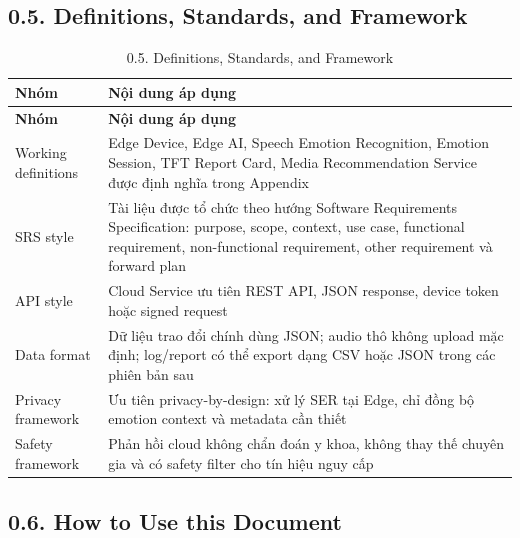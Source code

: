\documentclass[12pt,a4paper]{article}
\begin{document}
\subsection*{0.5. Definitions, Standards, and Framework}

\begin{center}
\begin{longtable}{|P{0.30\textwidth}|P{0.62\textwidth}|}
\caption{0.5. Definitions, Standards, and Framework}\\
\hline
\textbf{Nhóm} & \textbf{Nội dung áp dụng} \\
\hline
\endfirsthead
\hline
\textbf{Nhóm} & \textbf{Nội dung áp dụng} \\
\hline
\endhead
Working definitions & Edge Device, Edge AI, Speech Emotion Recognition, Emotion Session, TFT Report Card, Media Recommendation Service được định nghĩa trong Appendix \\
\hline
SRS style & Tài liệu được tổ chức theo hướng Software Requirements Specification: purpose, scope, context, use case, functional requirement, non-functional requirement, other requirement và forward plan \\
\hline
API style & Cloud Service ưu tiên REST API, JSON response, device token hoặc signed request \\
\hline
Data format & Dữ liệu trao đổi chính dùng JSON; audio thô không upload mặc định; log/report có thể export dạng CSV hoặc JSON trong các phiên bản sau \\
\hline
Privacy framework & Ưu tiên privacy-by-design: xử lý SER tại Edge, chỉ đồng bộ emotion context và metadata cần thiết \\
\hline
Safety framework & Phản hồi cloud không chẩn đoán y khoa, không thay thế chuyên gia và có safety filter cho tín hiệu nguy cấp \\
\hline
\end{longtable}
\end{center}

\subsection*{0.6. How to Use this Document}
\end{document}
